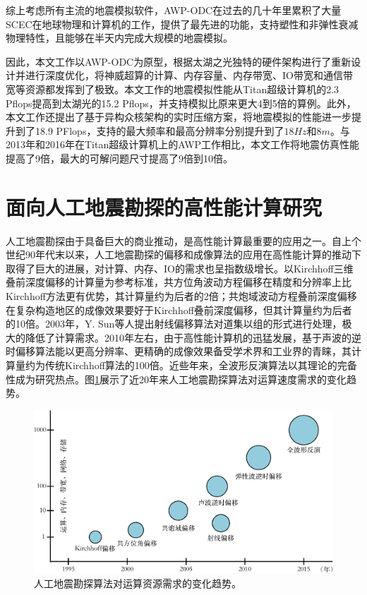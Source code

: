 \documentclass[degree=doctor]{thuthesis}
\begin{document}
综上考虑所有主流的地震模拟软件，AWP-ODC在过去的几十年里累积了大量SCEC在地球物理和计算机的工作，提供了最先进的功能，支持塑性和非弹性衰减物理特性，且能够在半天内完成大规模的地震模拟。

因此，本文工作以AWP-ODC为原型，根据太湖之光独特的硬件架构进行了重新设计并进行深度优化，将神威超算的计算、内存容量、内存带宽、IO带宽和通信带宽等资源都发挥到了极致。本文工作的地震模拟性能从Titan超级计算机的2.3 Pflops提高到太湖光的15.2 Pflops，并支持模拟比原来更大4到5倍的算例。此外，本文工作还提出了基于异构众核架构的实时压缩方案，将地震模拟的性能进一步提升到了18.9 PFlops，支持的最大频率和最高分辨率分别提升到了$18Hz$和$8m$。与2013年和2016年在Titan超级计算机上的AWP工作相比，本文工作将地震仿真性能提高了9倍，最大的可解问题尺寸提高了9倍到10倍。



\section{面向人工地震勘探的高性能计算研究}

人工地震勘探由于具备巨大的商业推动，是高性能计算最重要的应用之一。自上个世纪90年代末以来，人工地震勘探的偏移和成像算法的应用在高性能计算的推动下取得了巨大的进展，对计算、内存、IO的需求也呈指数级增长。以Kirchhoff三维叠前深度偏移\cite{yilmaz2001seismic}的计算量为参考标准，共方位角波动方程偏移\cite{rickett2002offset}在精度和分辨率上比Kirchhoff方法更有优势，其计算量约为后者的2倍；共炮域波动方程叠前深度偏移\cite{zhang2005theory}在复杂构造地区的成像效果要好于Kirchhoff叠前深度偏移，但其计算量约为后者的10倍。2003年，Y. Sun等人提出射线偏移算法\cite{sun20003}对道集以组的形式进行处理，极大的降低了计算需求。2010年左右，由于高性能计算机的迅猛发展，基于声波的逆时偏移算法\cite{baysal1983reverse}能以更高分辨率、更精确的成像效果备受学术界和工业界的青睐，其计算量约为传统Kirchhoff算法的100倍。近些年来，全波形反演算法\cite{tarantola1984inversion}以其理论的完备性成为研究热点。图\ref{fig:seismicmethod}展示了近20年来人工地震勘探算法对运算速度需求的变化趋势。

\begin{figure}[ht]
\centering
\includegraphics[width=0.7\columnwidth]{地震勘探算法与资源需求-crop.pdf}
\caption{人工地震勘探算法对运算资源需求的变化趋势。}
\label{fig:seismicmethod}
\end{figure}
\end{document}
